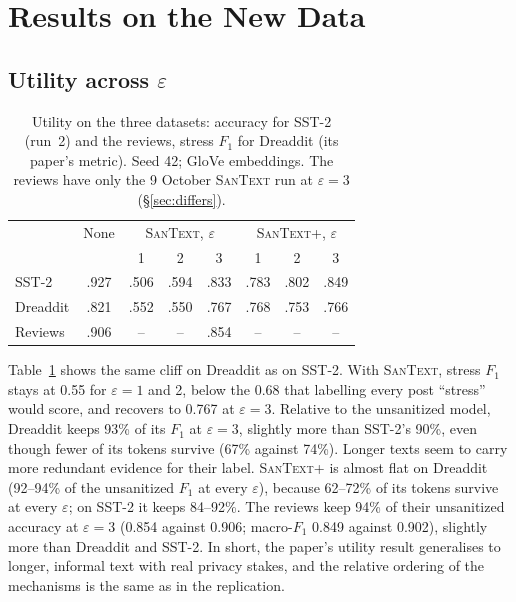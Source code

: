 \documentclass[11pt]{article}
\newcommand{\santext}{\textsc{SanText}}
\newcommand{\santextp}{\textsc{SanText}+}
\begin{document}
\section{Results on the New Data}
\label{sec:results}

\subsection{Utility across $\varepsilon$}
\begin{table}[t]
\centering\small
\setlength{\tabcolsep}{4pt}
\begin{tabular}{@{}lccccccc@{}}
\toprule
 & None & \multicolumn{3}{c}{\santext{}, $\varepsilon$} & \multicolumn{3}{c}{\santextp{}, $\varepsilon$} \\
 & & 1 & 2 & 3 & 1 & 2 & 3 \\
\midrule
SST-2 & .927 & .506 & .594 & .833 & .783 & .802 & .849 \\
Dreaddit & .821 & .552 & .550 & .767 & .768 & .753 & .766 \\
Reviews & .906 & -- & -- & .854 & -- & -- & -- \\
\bottomrule
\end{tabular}
\caption{Utility on the three datasets: accuracy for SST-2 (run~2) and the reviews, stress $F_1$ for Dreaddit (its paper's metric). Seed 42; GloVe embeddings. The reviews have only the 9 October \santext{} run at $\varepsilon = 3$ (§\ref{sec:differs}).}
\label{tab:newresults}
\end{table}
Table~\ref{tab:newresults} shows the same cliff on Dreaddit as on SST-2. With \santext{}, stress $F_1$ stays at 0.55 for $\varepsilon = 1$ and 2, below the 0.68 that labelling every post ``stress'' would score, and recovers to 0.767 at $\varepsilon = 3$. Relative to the unsanitized model, Dreaddit keeps 93\% of its $F_1$ at $\varepsilon = 3$, slightly more than SST-2's 90\%, even though fewer of its tokens survive (67\% against 74\%). Longer texts seem to carry more redundant evidence for their label. \santextp{} is almost flat on Dreaddit (92--94\% of the unsanitized $F_1$ at every $\varepsilon$), because 62--72\% of its tokens survive at every $\varepsilon$; on SST-2 it keeps 84--92\%. The reviews keep 94\% of their unsanitized accuracy at $\varepsilon = 3$ (0.854 against 0.906; macro-$F_1$ 0.849 against 0.902), slightly more than Dreaddit and SST-2. In short, the paper's utility result generalises to longer, informal text with real privacy stakes, and the relative ordering of the mechanisms is the same as in the replication.
\end{document}
